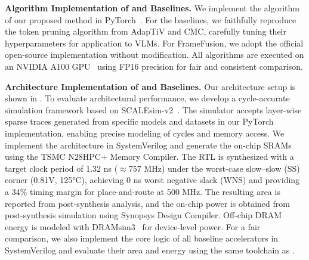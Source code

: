 \begin{table}[b]
    \centering
    \caption{{\proj Architecture Setup}}
    \label{tab:hardware-config}
\end{table}
\textbf{Algorithm Implementation of \proj and Baselines.}
We implement the algorithm of our proposed \proj method in PyTorch~\cite{paszke2019pytorch}. For the baselines, we faithfully reproduce the token pruning algorithm from AdapTiV and CMC, carefully tuning their hyperparameters for application to VLMs. For FrameFusion, we adopt the official open-source implementation without modification. All algorithms are executed on an NVIDIA A100 GPU~\cite{nvidia2020a100} using FP16 precision for fair and consistent comparison.

\textbf{Architecture Implementation of \proj and Baselines.}
Our \proj architecture setup is shown in . To evaluate architectural performance, we develop a cycle-accurate simulation framework based on SCALEsim-v2~\cite{samajdar2018scale}. {The simulator accepts layer-wise sparse traces generated from specific models and datasets in our PyTorch implementation, enabling precise modeling of cycles and memory access.} {We implement the \proj architecture in SystemVerilog and generate the on-chip SRAMs using the TSMC N28HPC+ Memory Compiler. The RTL is synthesized with a target clock period of 1.32 ns ($\approx$757 MHz) under the worst-case slow–slow (SS) corner (0.81V, 125°C), achieving 0 ns worst negative slack (WNS) and providing a 34\% timing margin for place-and-route at 500 MHz. The resulting area is reported from post-synthesis analysis, and the on-chip power is obtained from post-synthesis simulation using Synopsys Design Compiler. Off-chip DRAM energy is modeled with DRAMsim3~\cite{li2020dramsim3} for device-level power.}
For a fair comparison, we also implement the core logic of all baseline accelerators in SystemVerilog and evaluate their area and energy using the same toolchain as \proj. 


